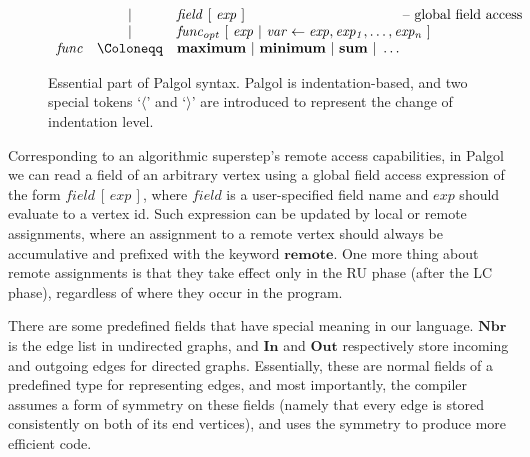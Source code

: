 \documentclass{sokendai_thesis} %
\newcommand{\hsp}[1]{\hspace{-3em}\hbox{#1}}
\begin{document}
\begin{figure}[t]
\[\begin{array}{lclr}
 & | & \mathit{field}~[~\mathit{exp}~] & \hsp{-- global field access} \\
 & | & \mathit{func_{opt}}~[~\mathit{exp}~|~\mathit{var}\leftarrow\mathit{exp},\mathit{exp_1},\ldots,\mathit{exp_n}~] \\
\mathit{func}  & \Coloneqq & \mathbf{maximum}~|~\mathbf{minimum}~|~\mathbf{sum}~|~\ldots \\
 \end{array}
\]
\caption{Essential part of Palgol syntax. Palgol is indentation-based, and two special tokens `$\langle$' and `$\rangle$' are introduced to represent the change of indentation level.}
\label{fig:syntax-simplified}
\vspace{-2ex}
\end{figure}

Corresponding to an algorithmic superstep's remote access capabilities, in Palgol we can read a field of an arbitrary vertex using a global field access expression of the form $\mathit{field}~[\,\mathit{exp}\,]$, 
where $\mathit{field}$ is a user-specified field name and $\mathit{exp}$ should evaluate to a vertex id.
Such expression can be updated by local or remote assignments, where an assignment to a remote vertex should always be accumulative and prefixed with the keyword $\mathbf{remote}$.
One more thing about remote assignments is that they take effect only in the RU phase (after the LC phase), regardless of where they occur in the program.

There are some predefined fields that have special meaning in our language.
$\mathbf{Nbr}$ is the edge list in undirected graphs, and $\mathbf{In}$ and $\mathbf{Out}$ respectively store incoming and outgoing edges for directed graphs.
Essentially, these are normal fields of a predefined type for representing edges, and most importantly, the compiler assumes a form of symmetry on these fields (namely that every edge is stored consistently on both of its end vertices), and uses the symmetry to produce more efficient code.
\end{document}
